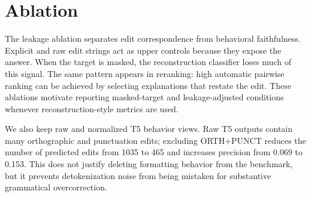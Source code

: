 \section{Ablation}



The leakage ablation separates edit correspondence from behavioral faithfulness. Explicit and raw edit strings act as upper controls because they expose the answer. When the target is masked, the reconstruction classifier loses much of this signal. The same pattern appears in reranking: high automatic pairwise ranking can be achieved by selecting explanations that restate the edit. These ablations motivate reporting masked-target and leakage-adjusted conditions whenever reconstruction-style metrics are used.

We also keep raw and normalized T5 behavior views. Raw T5 outputs contain many orthographic and punctuation edits; excluding ORTH+PUNCT reduces the number of predicted edits from 1035 to 465 and increases precision from 0.069 to 0.153. This does not justify deleting formatting behavior from the benchmark, but it prevents detokenization noise from being mistaken for substantive grammatical overcorrection.
